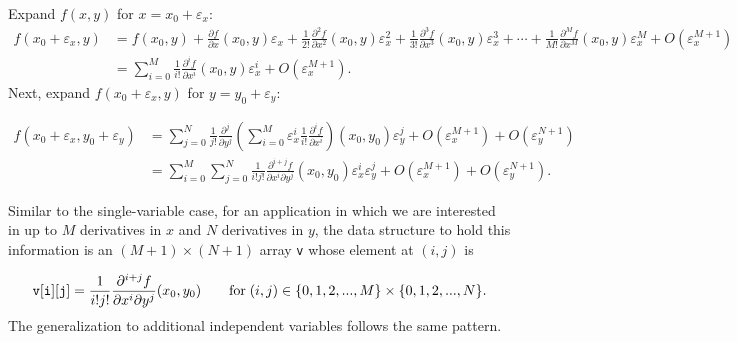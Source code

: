 \documentclass{article}
\begin{document}
Expand $f(x,y)$ for $x=x_0+\varepsilon_x$:
\begin{align*}
f(x_0+\varepsilon_x,y) &= f(x_0,y)
+ \frac{\partial f}{\partial x}(x_0,y)\varepsilon_x
+ \frac{1}{2!}\frac{\partial^2 f}{\partial x^2}(x_0,y)\varepsilon_x^2
+ \frac{1}{3!}\frac{\partial^3 f}{\partial x^3}(x_0,y)\varepsilon_x^3
+ \cdots
+ \frac{1}{M!}\frac{\partial^M f}{\partial x^M}(x_0,y)\varepsilon_x^M
+ O\left(\varepsilon_x^{M+1}\right) \\
&= \sum_{i=0}^M\frac{1}{i!}\frac{\partial^i f}{\partial x^i}(x_0,y)\varepsilon_x^i + O\left(\varepsilon_x^{M+1}\right).
\end{align*}
Next, expand $f(x_0+\varepsilon_x,y)$ for $y=y_0+\varepsilon_y$:

\begin{align*}
f(x_0+\varepsilon_x,y_0+\varepsilon_y) &= \sum_{j=0}^N\frac{1}{j!}\frac{\partial^j}{\partial y^j}
    \left(\sum_{i=0}^M\varepsilon_x^i\frac{1}{i!}\frac{\partial^if}{\partial x^i}\right)(x_0,y_0)\varepsilon_y^j
    + O\left(\varepsilon_x^{M+1}\right) + O\left(\varepsilon_y^{N+1}\right) \\
&= \sum_{i=0}^M\sum_{j=0}^N\frac{1}{i!j!}\frac{\partial^{i+j}f}{\partial x^i\partial y^j}(x_0,y_0)
   \varepsilon_x^i\varepsilon_y^j + O\left(\varepsilon_x^{M+1}\right) + O\left(\varepsilon_y^{N+1}\right).
\end{align*}

Similar to the single-variable case, for an application in which we are interested in up to $M$ derivatives in
$x$ and $N$ derivatives in $y$, the data structure to hold this information is an $(M+1)\times(N+1)$
array {\tt v} whose element at $(i,j)$ is

\[
{\tt v[i][j]} = \frac{1}{i!j!}\frac{\partial^{i+j}f}{\partial x^i\partial y^j}(x_0,y_0)
    \qquad \text{for}\; (i,j)\in\{0,1,2,...,M\}\times\{0,1,2,...,N\}.
\]
The generalization to additional independent variables follows the same pattern.
\end{document}

